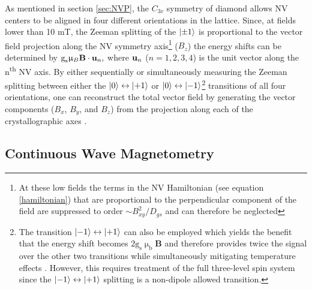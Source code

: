 As mentioned in section \ref{sec:NVP}, the $C_{3v}$ symmetry of diamond allows NV centers to be aligned in four different orientations in the lattice. Since, at fields lower than 10 mT, the Zeeman splitting of the $\ket{\pm 1}$ is proportional to the vector field projection along the NV symmetry axis\footnote{At these low fields the terms in the NV Hamiltonian (see equation \ref{hamiltonian}) that are proportional to the perpendicular component of the field are suppressed to order $\sim B_{xy}^2 / D_{gs}$ and can therefore be neglected\cite{taylor2008high}} ($B_z$) the energy shifts can be determined by $\text{g}_\text{s} \upmu_B \textbf{B} \cdot \textbf{\text{u}}_n,$ where $\textbf{\text{u}}_n$ ($n = 1,2,3,4$) is the unit vector along the n\textsuperscript{th} NV axis. By either sequentially \cite{clevenson2018Robust} or simultaneously \cite{schloss2018simultaneous, kitazawa2017vector} measuring the Zeeman splitting between either the $\ket{0} \leftrightarrow \ket{+1}$ or $\ket{0} \leftrightarrow \ket{-1}$\footnote{The transition $\ket{-1} \leftrightarrow \ket{+1}$ can also be employed which yields the benefit that the energy shift becomes $2\text{g}_\text{s}\upmu_\text{b}\textbf{B}$ and therefore provides twice the signal over the other two transitions while simultaneously mitigating temperature effects \cite{neumann2013high}. However, this requires treatment of the full three-level spin system since the $\ket{-1} \leftrightarrow \ket{+1}$ splitting is a non-dipole allowed transition.} transitions of all four orientations, one can reconstruct the total vector field by generating the vector components ($B_x$, $B_y$, and $B_z$) from the projection along each of the crystallographic axes \cite{kitazawa2017vector,schloss2018simultaneous}.

\subsection{Continuous Wave Magnetometry}

